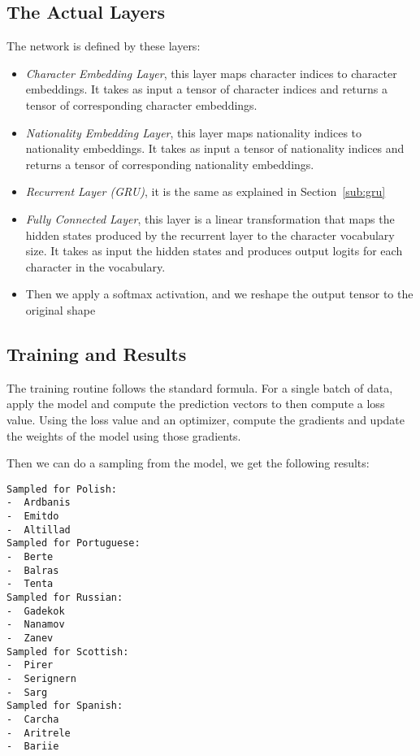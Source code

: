 \documentclass[12pt]{IEEEtran}
\begin{document}
\subsection{The Actual Layers}

The network is defined by these layers:

\begin{itemize}

    \item \emph{Character Embedding Layer}, this layer maps character indices
    to character embeddings. It takes as input a tensor of character indices
    and returns a tensor of corresponding character embeddings.

    \item \emph{Nationality Embedding Layer}, this layer maps nationality
    indices to nationality embeddings. It takes as input a tensor of
    nationality indices and returns a tensor of corresponding nationality
    embeddings.

    \item \emph{Recurrent Layer (GRU)}, it is the same as explained in
    Section~\ref{sub:gru}

    \item \emph{Fully Connected Layer}, this layer is a linear transformation
    that maps the hidden states produced by the recurrent layer to the
    character vocabulary size. It takes as input the hidden states and produces
    output logits for each character in the vocabulary.

    \item Then we apply a softmax activation,  and we reshape the output tensor
    to the original shape

\end{itemize}


\subsection{Training and Results}

The training routine follows the standard formula. For a single batch of data,
apply the model and compute the prediction vectors to then compute a loss
value. Using the loss value and an optimizer, compute the gradients and update
the weights of the model using those gradients.

Then we can do a sampling from the model, we get the following results:

\begin{verbatim}
Sampled for Polish:
-  Ardbanis
-  Emitdo
-  Altillad
Sampled for Portuguese:
-  Berte
-  Balras
-  Tenta
Sampled for Russian:
-  Gadekok
-  Nanamov
-  Zanev
Sampled for Scottish:
-  Pirer
-  Serignern
-  Sarg
Sampled for Spanish:
-  Carcha
-  Aritrele
-  Bariie
\end{verbatim}
\end{document}
